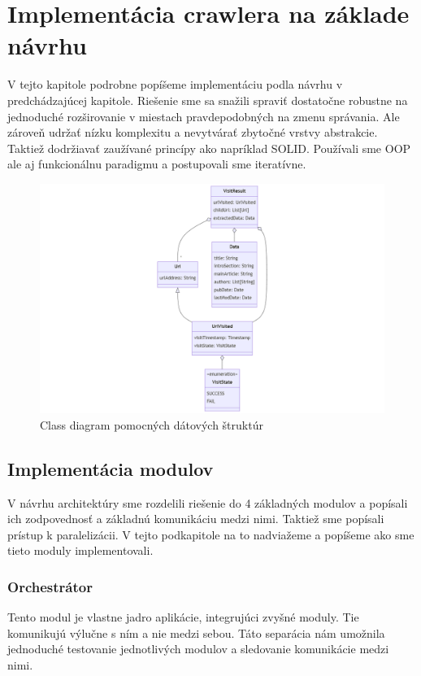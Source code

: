 \chapter{Implementácia crawlera na základe návrhu}
\label{implementation}
V tejto kapitole podrobne popíšeme implementáciu podla návrhu v predchádzajúcej kapitole. Riešenie sme sa snažili spraviť dostatočne robustne na jednoduché rozširovanie v miestach pravdepodobných na zmenu správania. Ale zároveň udržať nízku komplexitu a nevytvárať zbytočné vrstvy abstrakcie. Taktiež dodržiavať zaužívané princípy ako napríklad SOLID. 
Používali sme OOP ale aj funkcionálnu paradigmu a postupovali sme iteratívne. 

\begin{figure}[!ht]
    \centering
    \includegraphics[width=.9\textwidth]{figures/classDiagramVisitResult.png}
    \caption{Class diagram pomocných dátových štruktúr \label{o:classDiagramVisitResult}}
\end{figure}

\section{Implementácia modulov}
V návrhu architektúry sme rozdelili riešenie do 4 základných modulov a popísali ich zodpovednosť a základnú komunikáciu medzi nimi. Taktiež sme popísali prístup k paralelizácii. V tejto podkapitole na to nadviažeme a popíšeme ako sme tieto moduly implementovali. 

\subsection{Orchestrátor}
Tento modul je vlastne jadro aplikácie, integrujúci zvyšné moduly. Tie komunikujú výlučne s ním a nie medzi sebou. Táto separácia nám umožnila jednoduché testovanie jednotlivých modulov a sledovanie komunikácie medzi nimi.

